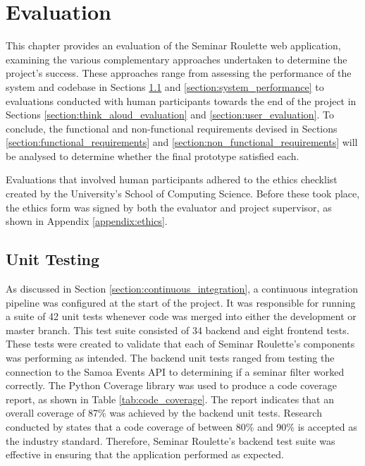 \documentclass{l4proj}
\begin{document}
\chapter{Evaluation} 
\label{chapter:evaluation} 

This chapter provides an evaluation of the Seminar Roulette web application, examining the various complementary approaches undertaken to determine the project's success. These approaches range from assessing the performance of the system and codebase in Sections \ref{section:unit_testing} and \ref{section:system_performance} to evaluations conducted with human participants towards the end of the project in Sections \ref{section:think_aloud_evaluation} and \ref{section:user_evaluation}. To conclude, the functional and non-functional requirements devised in Sections \ref{section:functional_requirements} and \ref{section:non_functional_requirements} will be analysed to determine whether the final prototype satisfied each.

Evaluations that involved human participants adhered to the ethics checklist created by the University's School of Computing Science. Before these took place, the ethics form was signed by both the evaluator and project supervisor, as shown in Appendix \ref{appendix:ethics}.

\section{Unit Testing}
\label{section:unit_testing}

As discussed in Section \ref{section:continuous_integration}, a continuous integration pipeline was configured at the start of the project. It was responsible for running a suite of 42 unit tests whenever code was merged into either the development or master branch. This test suite consisted of 34 backend and eight frontend tests. These tests were created to validate that each of Seminar Roulette's components was performing as intended. The backend unit tests ranged from testing the connection to the Samoa Events API to determining if a seminar filter worked correctly. The Python Coverage library \citep{pythoncoverage} was used to produce a code coverage report, as shown in Table \ref{tab:code_coverage}. The report indicates that an overall coverage of 87\% was achieved by the backend unit tests. Research conducted by \cite{GEORGE2004337} states that a code coverage of between 80\% and 90\% is accepted as the industry standard. Therefore, Seminar Roulette's backend test suite was effective in ensuring that the application performed as expected.
\end{document}
